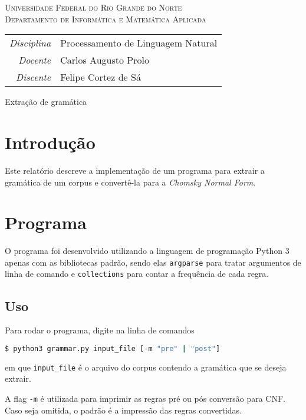 \documentclass[12pt, a4paper]{article}
\newcommand{\code}[1]{{\lstinline{#1}}}
\begin{document}
\begin{center}
    \textsc{Universidade Federal do Rio Grande do Norte} \\
    \textsc{Departamento de Informática e Matemática Aplicada}
\end{center}

\bigskip

\begin{tabular}{@{}rl@{}}
    \emph{Disciplina} & Processamento de Linguagem Natural \\
    \emph{Docente}    & Carlos Augusto Prolo \\
    \emph{Discente}   & Felipe Cortez de Sá \\
\end{tabular}

\bigskip

\begin{center}
\large Extração de gramática
\end{center}

\section{Introdução}
Este relatório descreve a implementação de um programa para extrair a gramática
de um corpus e convertê-la para a \emph{Chomsky Normal Form}.

\section{Programa}
O programa foi desenvolvido utilizando a linguagem de programação Python 3
apenas com as bibliotecas padrão, sendo elas \code{argparse} para tratar
argumentos de linha de comando e \code{collections} para contar a frequência de
cada regra.


\subsection{Uso}
Para rodar o programa, digite na linha de comandos

\begin{lstlisting}[language=bash]
$ python3 grammar.py input_file [-m "pre" | "post"] 
\end{lstlisting}

em que \code{input_file} é o arquivo do corpus contendo a gramática que se
deseja extrair.

A flag \code{-m} é utilizada para imprimir as regras pré ou pós conversão para
CNF. Caso seja omitida, o padrão é a impressão das regras convertidas.
\end{document}
